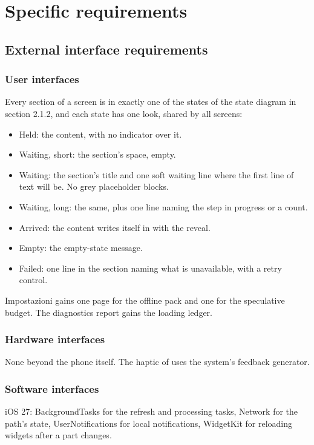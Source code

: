 \section{Specific requirements}

\subsection{External interface requirements}

\subsubsection{User interfaces}
Every section of a screen is in exactly one of the states of the state diagram in
section 2.1.2, and each state has one look, shared by all screens:
\begin{itemize}
  \item Held: the content, with no indicator over it.
  \item Waiting, short: the section's space, empty.
  \item Waiting: the section's title and one soft waiting line where the first line of text will be. No grey placeholder blocks.
  \item Waiting, long: the same, plus one line naming the step in progress or a count.
  \item Arrived: the content writes itself in with the reveal.
  \item Empty: the empty-state message.
  \item Failed: one line in the section naming what is unavailable, with a retry control.
\end{itemize}
Impostazioni gains one page for the offline pack and one for the speculative
budget. The diagnostics report gains the loading ledger.

\subsubsection{Hardware interfaces}
None beyond the phone itself. The haptic of  uses the system's feedback
generator.

\subsubsection{Software interfaces}
iOS 27: BackgroundTasks for the refresh and processing tasks, Network for the path's
state, UserNotifications for local notifications, WidgetKit for reloading widgets
after a part changes.

